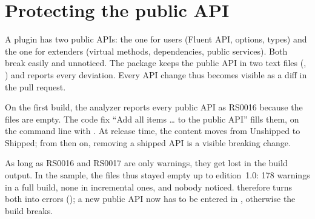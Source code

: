 \section{Protecting the public API}

A plugin has two public APIs: the one for users (Fluent API, options, types) and the one for
extenders (virtual methods, dependencies, public services). Both break easily and unnoticed.
The
package keeps the public API in two text files
(,
) and reports every
deviation. Every API change thus becomes visible as a diff in the pull request.

\begin{note}[Setup]
  On the first build, the analyzer reports every public API as RS0016 because the files are
  empty. The code fix “Add all items … to the public API” fills them, on the command line with
  . At release time,
  the content moves from Unshipped to Shipped; from then on, removing a shipped API is a
  visible breaking change.
\end{note}

\begin{important}
  As long as RS0016 and RS0017 are only warnings, they get lost in the build output. In the
  sample, the files thus stayed empty up to edition~1.0: 178 warnings in a full build, none
  in incremental ones, and nobody noticed.
   therefore turns both into errors
  (); a new public API now has to be entered
  in , otherwise the
  build breaks.
\end{important}
